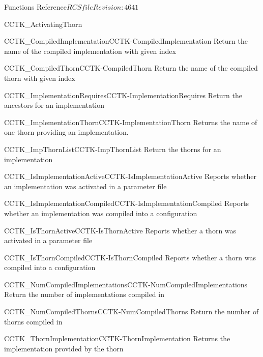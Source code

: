 \begin{cactuspart}{ Functions Reference}{$RCSfile$}{$Revision: 4641 $}
\begin{FunctionDescription}{CCTK\_ActivatingThorn}
\begin{SeeAlsoSection}
\begin{SeeAlso2}{CCTK\_CompiledImplementation}{CCTK-CompiledImplementation}
  Return the name of the compiled implementation with given index
\end{SeeAlso2}
\begin{SeeAlso2}{CCTK\_CompiledThorn}{CCTK-CompiledThorn}
  Return the name of the compiled thorn with given index
\end{SeeAlso2}
\begin{SeeAlso2}{CCTK\_ImplementationRequires}{CCTK-ImplementationRequires}
  Return the ancestors for an implementation
\end{SeeAlso2}
\begin{SeeAlso2}{CCTK\_ImplementationThorn}{CCTK-ImplementationThorn}
  Returns the name of one thorn providing an implementation.
\end{SeeAlso2}
\begin{SeeAlso2}{CCTK\_ImpThornList}{CCTK-ImpThornList}
  Return the thorns for an implementation
\end{SeeAlso2}
\begin{SeeAlso2}{CCTK\_IsImplementationActive}{CCTK-IsImplementationActive}
  Reports whether an implementation was activated in a parameter file
\end{SeeAlso2}
\begin{SeeAlso2}{CCTK\_IsImplementationCompiled}{CCTK-IsImplementationCompiled}
  Reports whether an implementation was compiled into a configuration
\end{SeeAlso2}
\begin{SeeAlso2}{CCTK\_IsThornActive}{CCTK-IsThornActive}
  Reports whether a thorn was activated in a parameter file
\end{SeeAlso2}
\begin{SeeAlso2}{CCTK\_IsThornCompiled}{CCTK-IsThornCompiled}
  Reports whether a thorn was compiled into a configuration
\end{SeeAlso2}
\begin{SeeAlso2}{CCTK\_NumCompiledImplementations}{CCTK-NumCompiledImplementations}
  Return the number of implementations compiled in
\end{SeeAlso2}
\begin{SeeAlso2}{CCTK\_NumCompiledThorns}{CCTK-NumCompiledThorns}
  Return the number of thorns compiled in
\end{SeeAlso2}
\begin{SeeAlso2}{CCTK\_ThornImplementation}{CCTK-ThornImplementation}
  Returns the implementation provided by the thorn
\end{SeeAlso2}
\end{SeeAlsoSection}


\end{FunctionDescription}
\end{cactuspart}
